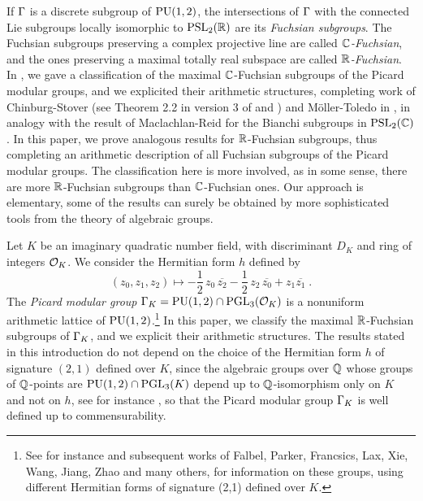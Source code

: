 \documentclass[11pt]{article}
\begin{document}
If $\Gamma$ is a discrete subgroup of $\operatorname{PU}(1,2)$, the intersections of
$\Gamma$ with the connected Lie subgroups locally isomorphic to $\operatorname{PSL}_{2}({\mathbb R})$
are its {\em Fuchsian subgroups}. The Fuchsian subgroups preserving a
complex projective line are called {\it ${\mathbb C}$-Fuchsian}, and the ones
preserving a maximal totally real subspace are called {\it
  ${\mathbb R}$-Fuchsian}. In \cite{ParPau17MS}, we gave a classification of
the maximal ${\mathbb C}$-Fuchsian subgroups of the Picard modular groups, and
we explicited their arithmetic structures, completing work of
Chinburg-Stover (see Theorem 2.2 in version 3 of \cite{ChiSto11} and
\cite[Theo.~4.1]{ChiSto18}) and Möller-Toledo in \cite{MolTol15}, in
analogy with the result of Maclachlan-Reid \cite[Thm.~9.6.3]{MacRei03}
for the Bianchi subgroups in $\operatorname{PSL}_{2}({\mathbb C})$. In this paper, we prove
analogous results for ${\mathbb R}$-Fuchsian subgroups, thus completing an
arithmetic description of all Fuchsian subgroups of the Picard modular
groups. The classification here is more involved, as in some sense,
there are more ${\mathbb R}$-Fuchsian subgroups than ${\mathbb C}$-Fuchsian ones. Our
approach is elementary, some of the results can surely be obtained by
more sophisticated tools from the theory of algebraic groups.



Let $K$ be an imaginary quadratic number field, with discriminant
$D_K$ and ring of integers ${\cal O}_K$. We consider the Hermitian form
$h$ defined by
$$
(z_0,z_1,z_2)\mapsto -\frac{1}{2}\,z_0\,\overline{z_2}
-\frac{1}{2}\,z_2\,\overline{z_0}+ z_1\overline{z_1}\;.
$$ The {\it Picard modular group} $\Gamma_K=\operatorname{PU}(1,2)\cap\operatorname{PGL}_3({\cal O}_K)$
is a nonuniform arithmetic lattice of $\operatorname{PU}(1,2)$.\footnote{See for
  instance \cite[Chap.~5]{Holzapfel98} and subsequent works of Falbel,
  Parker, Francsics, Lax, Xie, Wang, Jiang, Zhao and many others, for
  information on these groups, using different Hermitian forms of
  signature (2,1) defined over $K$.}  In this paper, we classify the
maximal ${\mathbb R}$-Fuchsian subgroups of $\Gamma_K$, and we explicit their
arithmetic structures. The results stated in this introduction do not
depend on the choice of the Hermitian form $h$ of signature $(2,1)$
defined over $K$, since the algebraic groups over ${\mathbb Q}$ whose groups
of ${\mathbb Q}$-points are $\operatorname{PU}(1,2)\cap \operatorname{PGL}_3(K)$ depend up to
${\mathbb Q}$-isomorphism only on $K$ and not on $h$, see for instance
\cite[\S~3.1]{Stover11}, so that the Picard modular group $\Gamma_K$ is
well defined up to commensurability.


\end{document}
